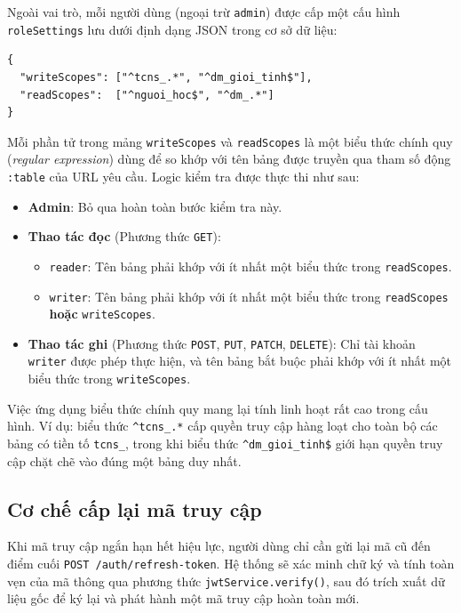 Ngoài vai trò, mỗi người dùng (ngoại trừ \texttt{admin}) được cấp một cấu hình \texttt{roleSettings} lưu dưới định dạng JSON trong cơ sở dữ liệu:

\begin{lstlisting}[caption={Cấu trúc cấu hình roleSettings}]
{
  "writeScopes": ["^tcns_.*", "^dm_gioi_tinh$"],
  "readScopes":  ["^nguoi_hoc$", "^dm_.*"]
}
\end{lstlisting}

Mỗi phần tử trong mảng \texttt{writeScopes} và \texttt{readScopes} là một biểu thức chính quy (\textit{regular expression}) dùng để so khớp với tên bảng được truyền qua tham số động \texttt{:table} của URL yêu cầu. Logic kiểm tra được thực thi như sau:

\begin{itemize}
    \item \textbf{Admin}: Bỏ qua hoàn toàn bước kiểm tra này.
    \item \textbf{Thao tác đọc} (Phương thức \texttt{GET}):
        \begin{itemize}
            \item \texttt{reader}: Tên bảng phải khớp với ít nhất một biểu thức trong \texttt{readScopes}.
            \item \texttt{writer}: Tên bảng phải khớp với ít nhất một biểu thức trong \texttt{readScopes} \textbf{hoặc} \texttt{writeScopes}.
        \end{itemize}
    \item \textbf{Thao tác ghi} (Phương thức \texttt{POST}, \texttt{PUT}, \texttt{PATCH}, \texttt{DELETE}): Chỉ tài khoản \texttt{writer} được phép thực hiện, và tên bảng bắt buộc phải khớp với ít nhất một biểu thức trong \texttt{writeScopes}.
\end{itemize}

Việc ứng dụng biểu thức chính quy mang lại tính linh hoạt rất cao trong cấu hình. Ví dụ: biểu thức \texttt{\^{}tcns\_.*} cấp quyền truy cập hàng loạt cho toàn bộ các bảng có tiền tố \texttt{tcns\_}, trong khi biểu thức \texttt{\^{}dm\_gioi\_tinh\$} giới hạn quyền truy cập chặt chẽ vào đúng một bảng duy nhất.

\subsection{Cơ chế cấp lại mã truy cập}

Khi mã truy cập ngắn hạn hết hiệu lực, người dùng chỉ cần gửi lại mã cũ đến điểm cuối \texttt{POST /auth/refresh-token}. Hệ thống sẽ xác minh chữ ký và tính toàn vẹn của mã thông qua phương thức \texttt{jwtService.verify()}, sau đó trích xuất dữ liệu gốc để ký lại và phát hành một mã truy cập hoàn toàn mới.


